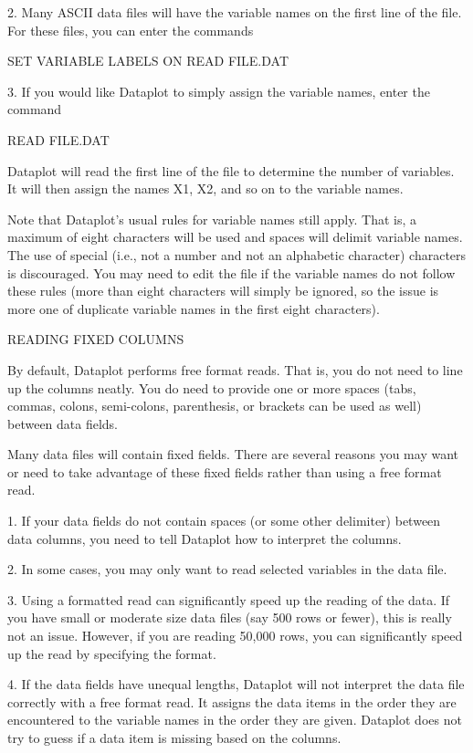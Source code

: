   2. Many ASCII data files will have the variable names on
     the first line of the file.  For these files, you can
     enter the commands

        SET VARIABLE LABELS ON
        READ FILE.DAT

  3. If you would like Dataplot to simply assign the variable
     names, enter the command

         READ FILE.DAT

     Dataplot will read the first line of the file to determine
     the number of variables.  It will then assign the names
     X1, X2, and so on to the variable names.

Note that Dataplot's usual rules for variable names still apply.
That is, a maximum of eight characters will be used and spaces will
delimit variable names.  The use of special (i.e., not a number and
not an alphabetic character) characters is discouraged.  You may
need to edit the file if the variable names do not follow these
rules (more than eight characters will simply be ignored, so the
issue is more one of duplicate variable names in the first eight
characters).


READING FIXED COLUMNS

By default, Dataplot performs free format reads.  That is,
you do not need to line up the columns neatly.  You do need
to provide one or more spaces (tabs, commas, colons, semi-colons,
parenthesis, or brackets can be used as well) between data fields.

Many data files will contain fixed fields.  There are several reasons
you may want or need to take advantage of these fixed fields rather
than using a free format read.

   1. If your data fields do not contain spaces (or some other
      delimiter) between data columns, you need to tell
      Dataplot how to interpret the columns.

   2. In some cases, you may only want to read selected
      variables in the data file.

   3. Using a formatted read can significantly speed up the reading
      of the data.  If you have small or moderate size data files (say
      500 rows or fewer), this is really not an issue.  However, if you
      are reading 50,000 rows, you can significantly speed up the read
      by specifying the format.

   4. If the data fields have unequal lengths, Dataplot will not
      interpret the data file correctly with a free format read.
      It assigns the data items in the order they are encountered
      to the variable names in the order they are given.  Dataplot
      does not try to guess if a data item is missing based on the
      columns.

